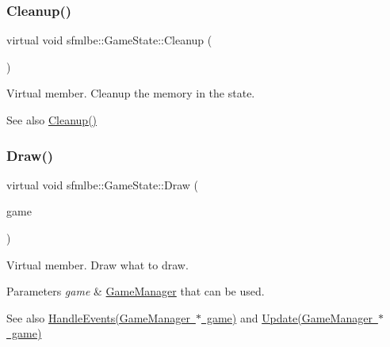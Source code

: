 \subsubsection{\texorpdfstring{Cleanup()}{Cleanup()}}
{\footnotesize\ttfamily virtual void sfmlbe\+::\+Game\+State\+::\+Cleanup (\begin{DoxyParamCaption}{ }\end{DoxyParamCaption})\hspace{0.3cm}{\ttfamily [pure virtual]}}



Virtual member. Cleanup the memory in the state. 

\begin{DoxySeeAlso}{See also}
\mbox{\hyperlink{classsfmlbe_1_1_game_state_ab8f53722c3d8c87d9ca3826b89f1da9b}{Cleanup()}} 
\end{DoxySeeAlso}
\mbox{\label{classsfmlbe_1_1_game_state_aa0b979c5694e117334eff4d3c1d25908}} 
\subsubsection{\texorpdfstring{Draw()}{Draw()}}
{\footnotesize\ttfamily virtual void sfmlbe\+::\+Game\+State\+::\+Draw (\begin{DoxyParamCaption}\item[{\mbox{\hyperlink{classsfmlbe_1_1_game_manager}{Game\+Manager}} $\ast$}]{game }\end{DoxyParamCaption})\hspace{0.3cm}{\ttfamily [pure virtual]}}



Virtual member. Draw what to draw. 


\begin{DoxyParams}{Parameters}
{\em game} & \mbox{\hyperlink{classsfmlbe_1_1_game_manager}{Game\+Manager}} that can be used. \\
\hline
\end{DoxyParams}
\begin{DoxySeeAlso}{See also}
\mbox{\hyperlink{classsfmlbe_1_1_game_state_a44242b884396f04b6832436eb4325f05}{Handle\+Events(\+Game\+Manager $\ast$ game)}} and \mbox{\hyperlink{classsfmlbe_1_1_game_state_ad3a1e8eb5d0598af841e0095033fa470}{Update(\+Game\+Manager $\ast$ game)}} 
\end{DoxySeeAlso}
\mbox{\label{classsfmlbe_1_1_game_state_a44242b884396f04b6832436eb4325f05}} 
